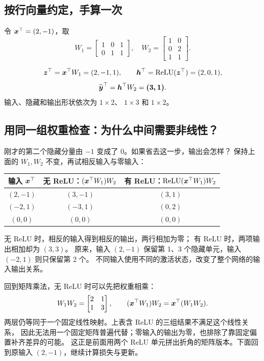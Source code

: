\subsection{按行向量约定，手算一次}
\label{sec:mlp-forward}
令 $\boldsymbol{x}^\top=(2,-1)$，取
\[
W_1=\begin{bmatrix}1&0&1\\0&1&1\end{bmatrix},\quad
W_2=\begin{bmatrix}1&0\\0&2\\1&1\end{bmatrix}.
\]
\begin{example}
\[
\boldsymbol{z}^\top=\boldsymbol{x}^\top W_1=(2,-1,1),\qquad
\boldsymbol{h}^\top=\operatorname{ReLU}(\boldsymbol{z}^\top)=(2,0,1),
\]
\[
\widehat{\boldsymbol{y}}^\top=\boldsymbol{h}^\top W_2=\boldsymbol{(3,1)}.
\]
输入、隐藏和输出形状依次为 $1\times2$、
$1\times3$ 和 $1\times2$。
\end{example}

\subsection{用同一组权重检查：为什么中间需要非线性？}
\label{sec:mlp-nonlinearity}

刚才的第二个隐藏分量由 $-1$ 变成了 $0$。如果省去这一步，输出会怎样？
保持上面的 $W_1,W_2$ 不变，再试相反输入与零输入：
\begin{center}\small
{}
\begin{tabular}{@{}ccc@{}}\toprule
输入 $\boldsymbol{x}^\top$ & 无 ReLU：$(\boldsymbol{x}^\top W_1)W_2$ & 有 ReLU：$\operatorname{ReLU}(\boldsymbol{x}^\top W_1)W_2$\\\midrule
$(2,-1)$ & $(3,-1)$ & $(3,1)$\\
$(-2,1)$ & $(-3,1)$ & $(0,2)$\\
$(0,0)$ & $(0,0)$ & $(0,0)$\\\bottomrule
\end{tabular}
\end{center}
无 ReLU 时，相反的输入得到相反的输出，两行相加为零；
有 ReLU 时，两项输出相加却为 $(3,3)$。
原来，输入 $(2,-1)$ 保留第 1、3 个隐藏单元，输入 $(-2,1)$ 则只保留第 2 个。
不同输入使用不同的激活状态，改变了整个网络的输入输出关系。

回到矩阵乘法，无 ReLU 时可以先把权重相乘：
\[
W_1W_2=\begin{bmatrix}2&1\\1&3\end{bmatrix},\qquad
(\boldsymbol{x}^\top W_1)W_2=\boldsymbol{x}^\top(W_1W_2).
\]
两层仍等同于一个固定线性映射。上表含 ReLU 的三组结果不满足这个线性关系，
因此无法用一个固定矩阵普遍代替；零输入的输出为零，也排除了靠固定偏置补齐差异的可能。
这正是前面用两个 ReLU 单元拼出折角的矩阵版本。下面回到原输入 $(2,-1)$，继续计算损失与更新。
\label{route:mlp-forward-end}

